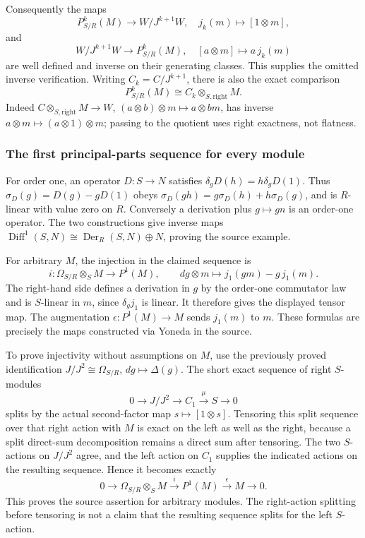 Consequently the maps \[
P^k_{S/R}(M)\longrightarrow W/J^{k+1}W,\quad j_k(m)\longmapsto[1\otimes m],
\] and \[
W/J^{k+1}W\longrightarrow P^k_{S/R}(M),\quad[a\otimes m]\longmapsto a\,j_k(m)
\] are well defined and inverse on their generating classes. This supplies the omitted inverse verification. Writing \(C_k=C/J^{k+1}\), there is also the exact comparison \[
P^k_{S/R}(M)\cong C_k\otimes_{S,\mathrm{right}}M.
\] Indeed \(C\otimes_{S,\mathrm{right}}M\to W\), \((a\otimes b)\otimes m\mapsto a\otimes bm\), has inverse \(a\otimes m\mapsto(a\otimes1)\otimes m\); passing to the quotient uses right exactness, not flatness.

\subsubsection{The first principal-parts sequence for every module}\label{the-first-principal-parts-sequence-for-every-module}

For order one, an operator \(D:S\to N\) satisfies \(\delta_gD(h)=h\delta_gD(1)\). Thus \(\sigma_D(g)=D(g)-gD(1)\) obeys \(\sigma_D(gh)=g\sigma_D(h)+h\sigma_D(g)\), and is \(R\)-linear with value zero on \(R\). Conversely a derivation plus \(g\mapsto gn\) is an order-one operator. The two constructions give inverse maps \(\operatorname{Diff}^1(S,N)\cong\operatorname{Der}_R(S,N)\oplus N\), proving the source example.

For arbitrary \(M\), the injection in the claimed sequence is \[
i:\Omega_{S/R}\otimes_SM\longrightarrow P^1(M),\qquad
dg\otimes m\longmapsto j_1(gm)-g\,j_1(m).
\] The right-hand side defines a derivation in \(g\) by the order-one commutator law and is \(S\)-linear in \(m\), since \(\delta_gj_1\) is linear. It therefore gives the displayed tensor map. The augmentation \(\epsilon:P^1(M)\to M\) sends \(j_1(m)\) to \(m\). These formulas are precisely the maps constructed via Yoneda in the source.

To prove injectivity without assumptions on \(M\), use the previously proved identification \(J/J^2\cong\Omega_{S/R}\), \(dg\mapsto\Delta(g)\). The short exact sequence of right \(S\)-modules \[
0\longrightarrow J/J^2\longrightarrow C_1\xrightarrow\mu S\longrightarrow0
\] splits by the actual second-factor map \(s\mapsto[1\otimes s]\). Tensoring this split sequence over that right action with \(M\) is exact on the left as well as the right, because a split direct-sum decomposition remains a direct sum after tensoring. The two \(S\)-actions on \(J/J^2\) agree, and the left action on \(C_1\) supplies the indicated actions on the resulting sequence. Hence it becomes exactly \[
0\longrightarrow\Omega_{S/R}\otimes_SM\xrightarrow{i}P^1(M)\xrightarrow{\epsilon}M\longrightarrow0.
\] This proves the source assertion for arbitrary modules. The right-action splitting before tensoring is not a claim that the resulting sequence splits for the left \(S\)-action.

